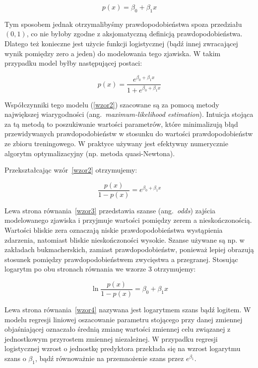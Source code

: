 \documentclass[12pt,a4paper,twoside,openany]{book}
\begin{document}
\begin{equation} \label{wzor1}
p(x) = \beta_0 + \beta_1x
\end{equation}

Tym sposobem jednak otrzymalibyśmy prawdopodobieństwa spoza przedziału $(0,1)$, co nie byłoby zgodne z aksjomatyczną definicją prawdopodobieństwa. Dlatego też konieczne jest użycie funkcji logistycznej (bądź innej zwracającej wynik pomiędzy zero a jeden) do modelowania tego zjawiska. W takim przypadku model byłby następującej postaci:

\begin{equation} \label{wzor2}
p(x) = \frac {e^{\beta_0 + \beta_1x}} {1 + e^{\beta_0 + \beta_1x}}
\end{equation}

Współczynniki tego modelu (\ref{wzor2}) szacowane są za pomocą metody największej wiarygodności (ang.~\textit{maximum-likelihood estimation}). Intuicja stojąca za tą metodą to poszukiwanie wartości parametrów, które minimalizują błąd przewidywanych prawdopodobieństw w stosunku do wartości prawdopodobieństw ze zbioru treningowego. W praktyce używany jest efektywny numerycznie algorytm optymalizacyjny (np. metoda quasi-Newtona).

Przekształcając wzór~\ref{wzor2} otrzymujemy:

\begin{equation} \label{wzor3}
\frac{p(x)}{1 - p(x)} = e^{\beta_0 + \beta_1x}
\end{equation}

Lewa strona równania~\ref{wzor3} przedstawia szanse (ang.~\textit{odds}) zajścia modelowanego zjawiska i przyjmuje wartości pomiędzy zerem a nieskończonością. Wartości bliskie zera oznaczają niskie prawdopodobieństwa wystąpienia zdarzenia, natomiast bliskie nieskończoności wysokie. Szanse używane są np. w zakładach bukmacherskich, zamiast prawdopodobieństw, ponieważ lepiej obrazują stosunek pomiędzy prawdopodobieństwem zwycięstwa a przegranej. Stosując logarytm po obu stronach równania we wzorze 3 otrzymujemy:

\begin{equation} \label{wzor4}
\ln \frac{p(x)}{1 - p(x)} = \beta_0 + \beta_1x
\end{equation}

Lewa strona równania~\ref{wzor4} nazywana jest logarytmem szans bądź logitem. W modelu regresji liniowej oszacowanie parametru stojącego przy danej zmiennej objaśniającej oznaczało średnią zmianę wartości zmiennej celu związanej z jednostkowym przyrostem zmiennej niezależnej. W przypadku regresji logistycznej wzrost o jednostkę predyktora przekłada się na wzrost logarytmu szans o $\beta_1$, bądź równoważnie na przemnożenie szans przez $e^{\beta_1}$.
\end{document}
